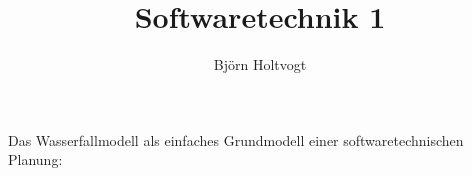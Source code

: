 \documentclass[parskip=full, 12pt]{scrartcl}
\begin{document}
\begin{titlepage}
\title{Softwaretechnik 1}
\author{Björn Holtvogt}
\date{}
\maketitle
\thispagestyle{empty} %
\begin{center}
Das Wasserfallmodell als einfaches Grundmodell einer softwaretechnischen Planung:
\end{center}
\end{titlepage}
	
\newpage
\pagestyle{empty}
\tableofcontents	
\newpage
\pagestyle{plain}
\setcounter{page}{1}


\newpage

\newpage

\newpage	

\newpage

\newpage

\newpage
	
\newpage	

\newpage
		
\newpage

	
\end{document}
